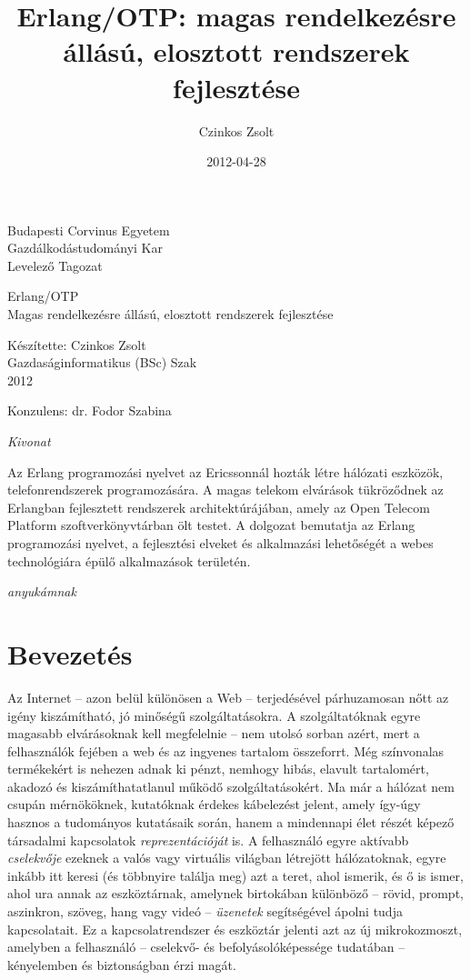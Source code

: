 \documentclass[12pt, a4paper, oneside]{book}
\author{Czinkos Zsolt}
\title{Erlang/OTP: magas rendelkezésre állású, elosztott rendszerek fejlesztése}
\date{2012-04-28}
\newenvironment{abstract}
{\newpage \pagestyle{empty} \vspace*{\fill} \begin{center}\em{Kivonat}\end{center}}
{\vspace*{\fill} \newpage}
\renewcommand{\maketitle}{
\begin{titlepage}
\noindent Budapesti Corvinus Egyetem\\
Gazdálkodástudományi Kar\\
Levelező Tagozat\\

\vspace{6cm}

\begin{center}
\Large{Erlang/OTP}\\
\vspace{0.3cm}
\large{Magas rendelkezésre állású, elosztott rendszerek
fejlesztése}
\end{center}

\vfill

\begin{flushright}
Készítette: Czinkos Zsolt\\
Gazdaságinformatikus (BSc) Szak\\
2012\\
\end{flushright}

\vspace{0.5cm}

\begin{center}
Konzulens: dr. Fodor Szabina
\end{center}

\end{titlepage}
}
\begin{document}
\maketitle

\onehalfspacing

\begin{abstract}
Az Erlang programozási nyelvet az Ericssonnál hozták létre hálózati
eszközök, telefonrendszerek programozására. A magas telekom elvárások
tükröződnek az Erlangban fejlesztett rendszerek architektúrájában,
amely az Open Telecom Platform szoftverkönyvtárban ölt testet. A dolgozat
bemutatja az Erlang programozási nyelvet, a fejlesztési elveket és
alkalmazási lehetőségét a webes technológiára épülő alkalmazások területén.
\end{abstract}

\newpage
\pagestyle{empty}
\vspace*{\fill} 
\hfill \emph{anyukámnak}
\vspace*{\fill} 
\newpage

\pagestyle{fancy}

\tableofcontents

\chapter{Bevezetés}

Az Internet -- azon belül különösen a Web -- terjedésével párhuzamosan nőtt az
igény kiszámítható, jó minőségű szolgáltatásokra. A szolgáltatóknak egyre
magasabb elvárásoknak kell megfelelnie -- nem utolsó sorban azért, mert a
felhasználók fejében a web és az ingyenes tartalom összeforrt. Még színvonalas
termékekért is nehezen adnak ki pénzt, nemhogy hibás, elavult tartalomért,
akadozó és kiszámíthatatlanul működő szolgáltatásokért. Ma már a hálózat nem
csupán mérnököknek, kutatóknak érdekes kábelezést jelent, amely így-úgy hasznos
a tudományos kutatásaik során, hanem a mindennapi élet részét képező társadalmi
kapcsolatok \textit{reprezentációját} is. A felhasználó egyre aktívabb
\textit{cselekvője} ezeknek a valós vagy virtuális világban létrejött
hálózatoknak, egyre inkább itt keresi (és többnyire találja meg) azt a teret,
ahol ismerik, és ő is ismer, ahol ura annak az eszköztárnak, amelynek
birtokában különböző -- rövid, prompt, aszinkron, szöveg, hang vagy videó --
\textit{üzenetek} segítségével ápolni tudja kapcsolatait. Ez a
kapcsolatrendszer és eszköztár jelenti azt az új mikrokozmoszt, amelyben a
felhasználó -- cselekvő- és befolyásolóképessége tudatában -- kényelemben és
biztonságban érzi magát.
\end{document}
